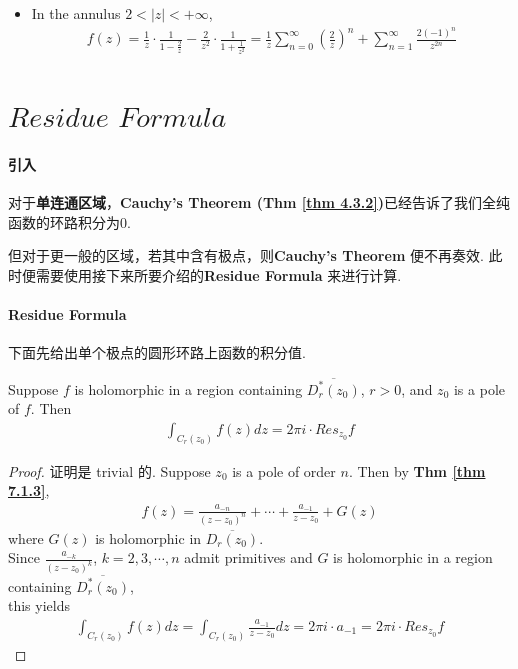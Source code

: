 \begin{enumerate}
\begin{solution}
\begin{itemize}
				\vspace{1em}
				
				\item In the annulus $2 < \left| z \right| < +\infty$,
				\begin{align}
					f(z) 
					= \frac{1}{z} \cdot \frac{1}{1 - \frac{2}{z}} - \frac{2}{z^2} \cdot \frac{1}{1 + \frac{1}{z^2}}
					= \frac{1}{z} \sum_{n = 0}^{\infty}{\left( \frac{2}{z} \right)^n} + \sum_{n = 1}^{\infty}{\frac{2(-1)^n}{z^{2n}}}
				\end{align}
			\end{itemize}
		\end{solution}
	\end{enumerate}

\newpage

\section{$Residue \,\, Formula$}
\paragraph{引入}
	对于\textbf{单连通区域}，\textbf{Cauchy's Theorem (Thm \ref{thm 4.3.2})}已经告诉了我们全纯函数的环路积分为0. 
	
	但对于更一般的区域，若其中含有极点，则\textbf{Cauchy's Theorem} 便不再奏效. 此时便需要使用接下来所要介绍的\textbf{Residue Formula} 来进行计算.

\vspace{2em}
\paragraph{\textbf{Residue Formula}}
	下面先给出单个极点的圆形环路上函数的积分值.
	\begin{thm}\label{thm 7.4.1}
		Suppose $f$ is holomorphic in a region containing $\overline{D_{r}^{*}(z_0)}$, $r > 0$, and $z_0$ is a pole of $f$. Then
		\begin{align}
			\int_{C_{r}(z_0)}{f(z) dz} = 2 \pi i \cdot Res_{z_0}f
		\end{align}
	
		\vspace{2em}
		\begin{proof}
			证明是 trivial 的. Suppose $z_0$ is a pole of order $n$. Then by \textbf{Thm \ref{thm 7.1.3}},
			\begin{align}
				f(z) = \frac{a_{-n}}{(z - z_0)^n} + \cdots + \frac{a_{-1}}{z - z_0} + G(z)
			\end{align}
			where $G(z)$ is holomorphic in $\overline{D_{r}(z_0)}$.\\
			Since $\frac{a_{-k}}{(z - z_0)^k}$,  $k = 2 , 3 , \cdots , n$ admit primitives and $G$ is holomorphic in a region containing $\overline{D_{r}^{*}(z_0)}$,\\
			this yields
			\begin{align}
				\int_{C_{r}(z_0)}{f(z) dz} = \int_{C_{r}(z_0)}{\frac{a_{-1}}{z - z_0} dz} = 2 \pi i \cdot a_{-1} = 2 \pi i \cdot Res_{z_0}f
			\end{align}
		\end{proof}
	\end{thm}


